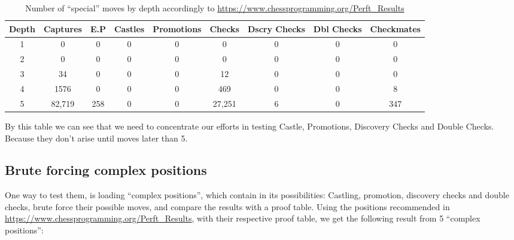 \documentclass[10pt]{article}
\begin{document}
\begin{table}[H]
\center
\begin{tabular}{|c|c|c|c|c|c|c|c|c|}
\hline
\textbf{Depth}   & \textbf{Captures} & \textbf{E.P} &
\textbf{Castles} & \textbf{Promotions} & \textbf{Checks} & \textbf{Dscry
Checks} & \textbf{Dbl Checks} & \textbf{Checkmates} \\
\hline
   1  & 0 & 0 & 0 & 0 & 0 & 0 & 0 & 0 \\
\hline
   2  & 0 & 0 & 0 & 0 & 0 & 0 & 0 & 0 \\
\hline
   3  & 34 & 0 & 0 & 0 & 12 & 0 & 0 & 0 \\
\hline
   4  & 1576 & 0 & 0 & 0 & 469 & 0 & 0 & 8 \\
\hline
5  & 82,719 & 258 & 0 & 0 & 27,251 & 6 & 0 & 347 \\
\hline
\end{tabular}
\caption{Number of ``special'' moves by depth accordingly to
\url{https://www.chessprogramming.org/Perft_Results} }
\end{table}

By this table we can see that we need to concentrate our efforts in testing
Castle, Promotions, Discovery Checks and Double Checks. Because they don't arise
until moves later than 5.

\subsection{Brute forcing complex positions}


One way to test them, is loading ``complex positions'', which contain in its
possibilities: Castling, promotion, discovery checks and double checks, brute
force their
possible moves, and compare the results with a proof table. Using the
positions recommended in \url{https://www.chessprogramming.org/Perft_Results},
with their respective proof table,
we get the following result from 5 ``complex positions'':
\end{document}
